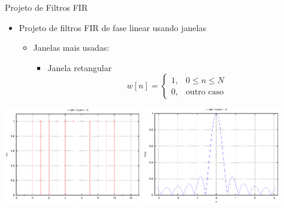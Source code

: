 \begin{slide}{Projeto de Filtros FIR}
\begin{itemize}
   \item  Projeto de filtros FIR de fase linear usando janelas 
   \begin{itemize}
      \item Janelas mais usadas:
      \begin{itemize}
         \item Janela retangular
         \begin{equation*}
            w[n] = \begin{cases}1,&0\leq n\leq N\\ 0,& \text{outro caso}\end{cases}
         \end{equation*}
       \end{itemize}
   \end{itemize}
\end{itemize}
\includegraphics[width=0.45\textwidth]{figs/wn_ret_10.eps}
\includegraphics[width=0.45\textwidth]{figs/w_ret_10.eps}
\end{slide}

